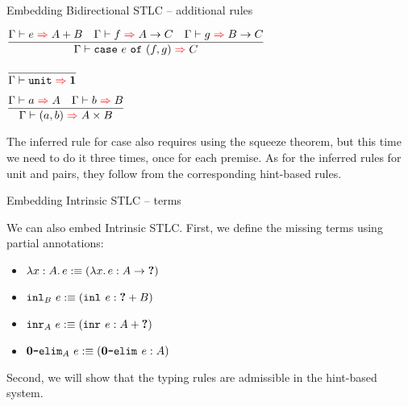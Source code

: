 \documentclass{beamer}
\begin{document}
\begin{frame}{Embedding Bidirectional STLC -- additional rules}

\begin{center}
  $\infrule{\infer{e}{\Sum{A}{B}} \quad \infer{f}{\Fun{A}{C}} \quad \infer{g}{\Fun{B}{C}}}{\infer{\case{e}{f}{g}}{C}}$

  \vspace{2em}

  $\infrule{}{\infer{\unit}{\Unit}}$

  \vspace{2em}

  $\infrule{\infer{a}{A} \quad \infer{b}{B}}{\infer{\pair{a}{b}}{\Prod{A}{B}}}$
\end{center}

\vspace{1em}

The inferred rule for case also requires using the squeeze theorem, but this time we need to do it three times, once for each premise. As for the inferred rules for unit and pairs, they follow from the corresponding hint-based rules.

\end{frame}

\begin{frame}{Embedding Intrinsic STLC -- terms}

We can also embed Intrinsic STLC. First, we define the missing terms using partial annotations:

\begin{itemize}
  \item $\fun{x}[A]{e} :\equiv \annot{\fun{x}{e}}{\Fun{A}{\Hole}}$ \\
  \item $\inl[B]{e} :\equiv \annot{\inl{e}}{\Sum{\Hole}{B}}$ \\
  \item $\inr[A]{e} :\equiv \annot{\inr{e}}{\Sum{A}{\Hole}}$ \\
  \item $\emptyelim[A]{e} :\equiv \annot{\emptyelim{e}}{A}$
\end{itemize}

\vspace{2em}

Second, we will show that the typing rules are admissible in the hint-based system.

\end{frame}
\end{document}
